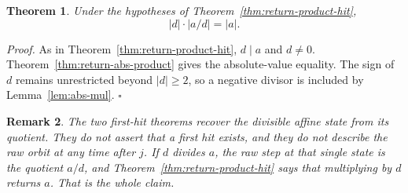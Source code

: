 \documentclass[11pt,letterpaper]{article}
\newtheorem{theorem}{Theorem}
\newtheorem{remark}[theorem]{Remark}
\newenvironment{proof}{\noindent\textit{Proof.}}{\hfill\(\square\)}
\begin{document}
\begin{theorem}
\label{thm:return-abs-product-hit}
Under the hypotheses of Theorem~\ref{thm:return-product-hit},
\[
|d|\cdot|a/d|=|a|.
\]
\end{theorem}

\begin{proof}
As in Theorem~\ref{thm:return-product-hit}, \(d\mid a\) and \(d\neq 0\).
Theorem~\ref{thm:return-abs-product} gives the absolute-value equality. The
sign of \(d\) remains unrestricted beyond \(|d|\ge 2\), so a negative divisor
is included by Lemma~\ref{lem:abs-mul}.
\end{proof}

\begin{remark}
The two first-hit theorems recover the divisible affine state from its
quotient. They do not assert that a first hit exists, and they do not describe
the raw orbit at any time after \(j\). If \(d\) divides \(a\), the raw step at
that single state is the quotient \(a/d\), and Theorem~\ref{thm:return-product-hit}
says that multiplying by \(d\) returns \(a\). That is the whole claim.
\end{remark}
\end{document}

